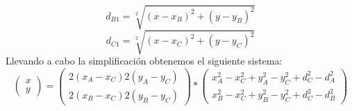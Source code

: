 \documentclass[a4paper ,12pt, onecolumn]{article}
\begin{document}
                \begin{equation}
                    d_{B1}= \sqrt[2]{(x-x_B)^2+(y-y_B)^2}
                \end{equation}
                \begin{equation}
                    d_{C1}= \sqrt[2]{(x-x_C)^2+(y-y_C)^2}
                \end{equation}
                Llevando a cabo la simplificación obtenemos el siguiente sistema:
                \begin{equation}
                    \begin{pmatrix}
                        x \\
                        y 
                    \end{pmatrix}=
                    \begin{pmatrix}
                        2(x_A-x_C) 2(y_A-y_C) \\
                        2(x_B-x_C) 2(y_B-y_C) 
                    \end{pmatrix} 
                    * 
                    \begin{pmatrix}
                        x_A^2-x_C^2+y_A^2-y_C^2+d_C^2-d_A^2 \\
                        x_B^2-x_C^2+y_B^2-y_C^2+d_C^2-d_B^2 
                    \end{pmatrix} 
                \end{equation}
                
\end{document}
